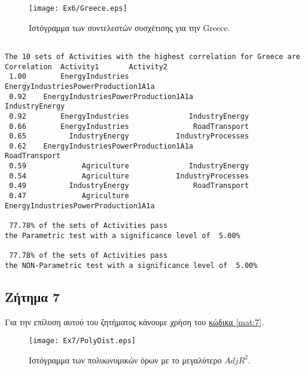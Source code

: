 \documentclass[11pt]{scrartcl} %
\begin{document}
\begin{figure}[H]

	\centering
	\texttt{[image: Ex6/Greece.eps]}	
\caption{Ιστόγραμμα των συντελεστών συσχέτισης για την Greece.}
\label{fig:z64} 
\end{figure}



\begin{Verbatim}[fontsize=\small]

The 10 sets of Activities with the highest correlation for Greece are
Correlation	 Activity1	 	 Activity2
 1.00	     EnergyIndustries	 	 EnergyIndustriesPowerProduction1A1a 
 0.92	 EnergyIndustriesPowerProduction1A1a	 	       IndustryEnergy 
 0.92	     EnergyIndustries	 	       IndustryEnergy 
 0.66	     EnergyIndustries	 	        RoadTransport 
 0.65	       IndustryEnergy	 	    IndustryProcesses 
 0.62	 EnergyIndustriesPowerProduction1A1a	 	        RoadTransport 
 0.59	          Agriculture	 	       IndustryEnergy 
 0.54	          Agriculture	 	    IndustryProcesses 
 0.49	       IndustryEnergy	 	        RoadTransport 
 0.47	          Agriculture	 	 EnergyIndustriesPowerProduction1A1a 

 77.78% of the sets of Activities pass 
the Parametric test with a significance level of  5.00%

 77.78% of the sets of Activities pass 
the NON-Parametric test with a significance level of  5.00%
\end{Verbatim}






\subsection{Ζήτημα 7}
\label{subsec:z7}

Για την επίλυση αυτού του ζητήματος κάνουμε χρήση του \hyperref[mat:7]{κώδικα \ref*{mat:7}}.


\begin{figure}[H]
 
	\centering
	\texttt{[image: Ex7/PolyDist.eps]}	
\caption{Ιστόγραμμα των πολυωνυμικών όρων με το μεγαλύτερο $AdjR^2$.}
\label{fig:z7}
\end{figure}
\end{document}
